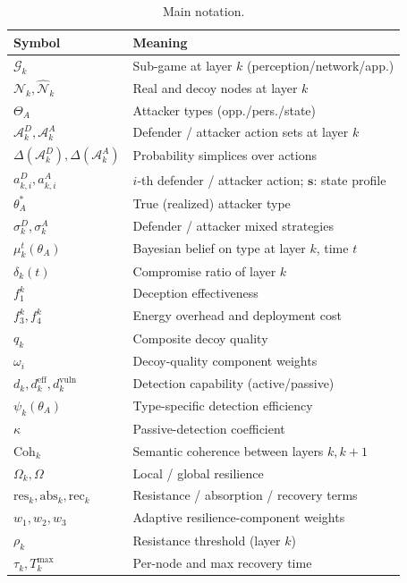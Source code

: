 \documentclass[conference]{IEEEtran}
\newcommand{\Coh}{\mathrm{Coh}}
\begin{document}
\begin{table}[t]
\centering
\caption{Main notation.}
\label{tab:notation}
\small
\begin{tabular}{ll}
\toprule
\textbf{Symbol} & \textbf{Meaning} \\
\midrule
$\mathcal{G}_k$ & Sub-game at layer $k$ (perception/network/app.) \\
$\mathcal{N}_k,\hat{\mathcal{N}}_k$ & Real and decoy nodes at layer $k$ \\
$\Theta_A$ & Attacker types (opp./pers./state) \\
$\mathcal{A}_k^D,\mathcal{A}_k^A$ & Defender / attacker action sets at layer $k$ \\
$\Delta(\mathcal{A}_k^D),\Delta(\mathcal{A}_k^A)$ & Probability simplices over actions \\
$a_{k,i}^D,a_{k,i}^A$ & $i$-th defender / attacker action; $\mathbf{s}$: state profile \\
$\theta_A^*$ & True (realized) attacker type \\
$\sigma_k^D,\sigma_k^A$ & Defender / attacker mixed strategies \\
$\mu_k^t(\theta_A)$ & Bayesian belief on type at layer $k$, time $t$ \\
$\delta_k(t)$ & Compromise ratio of layer $k$ \\
$f_1^k$ & Deception effectiveness \\
$f_3^k,f_4^k$ & Energy overhead and deployment cost \\
$q_k$ & Composite decoy quality \\
$\omega_i$ & Decoy-quality component weights \\
$d_k,d_k^{\mathrm{eff}},d_k^{\mathrm{vuln}}$ & Detection capability (active/passive) \\
$\psi_k(\theta_A)$ & Type-specific detection efficiency \\
$\kappa$ & Passive-detection coefficient \\
$\Coh_k$ & Semantic coherence between layers $k,k{+}1$ \\
$\Omega_k,\Omega$ & Local / global resilience \\
$\mathrm{res}_k,\mathrm{abs}_k,\mathrm{rec}_k$ & Resistance / absorption / recovery terms \\
$w_1,w_2,w_3$ & Adaptive resilience-component weights \\
$\rho_k$ & Resistance threshold (layer $k$) \\
$\tau_k,T_k^{\max}$ & Per-node and max recovery time \\

\end{tabular}
\end{table}
\end{document}
